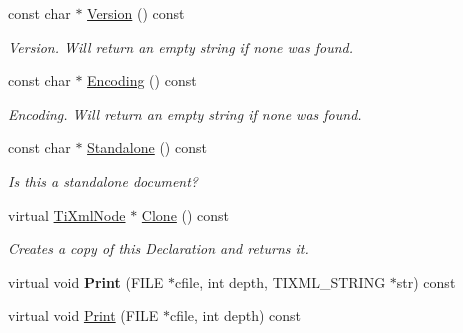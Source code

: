 \begin{DoxyCompactItemize}
\mbox{\label{class_ti_xml_declaration_a95cdcb9354ea220065bd378ffcacc7bd}} 
const char $\ast$ \hyperlink{class_ti_xml_declaration_a95cdcb9354ea220065bd378ffcacc7bd}{Version} () const
\begin{DoxyCompactList}\small\item\em Version. Will return an empty string if none was found. \end{DoxyCompactList}\item 
\mbox{\label{class_ti_xml_declaration_a8d3d1b5b226daa8353276d719497be80}} 
const char $\ast$ \hyperlink{class_ti_xml_declaration_a8d3d1b5b226daa8353276d719497be80}{Encoding} () const
\begin{DoxyCompactList}\small\item\em Encoding. Will return an empty string if none was found. \end{DoxyCompactList}\item 
\mbox{\label{class_ti_xml_declaration_a1f2f8a741593d15a61e491e5024cacef}} 
const char $\ast$ \hyperlink{class_ti_xml_declaration_a1f2f8a741593d15a61e491e5024cacef}{Standalone} () const
\begin{DoxyCompactList}\small\item\em Is this a standalone document? \end{DoxyCompactList}\item 
\mbox{\label{class_ti_xml_declaration_a35dc1455f69b79e81cae28e186944610}} 
virtual \hyperlink{class_ti_xml_node}{Ti\+Xml\+Node} $\ast$ \hyperlink{class_ti_xml_declaration_a35dc1455f69b79e81cae28e186944610}{Clone} () const
\begin{DoxyCompactList}\small\item\em Creates a copy of this Declaration and returns it. \end{DoxyCompactList}\item 
\mbox{\label{class_ti_xml_declaration_ace687d02a5a25a060ae3802abb1b3f55}} 
virtual void {\bfseries Print} (F\+I\+LE $\ast$cfile, int depth, T\+I\+X\+M\+L\+\_\+\+S\+T\+R\+I\+NG $\ast$str) const
\item 
virtual void \hyperlink{class_ti_xml_declaration_ae46cff6565f299210ab945e78bf28514}{Print} (F\+I\+LE $\ast$cfile, int depth) const

\end{DoxyCompactItemize}

